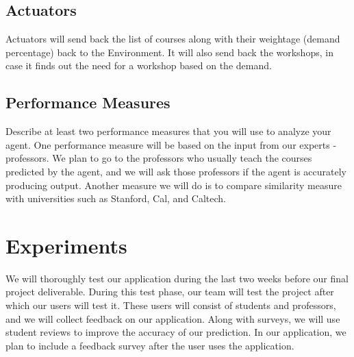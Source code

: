 \documentclass{article}
\begin{document}
\subsection{Actuators}
Actuators will send back the list of courses along with their weightage (demand percentage) back to the Environment. It will also send back the workshops, in case it finds out the need for a workshop based on the demand.

\subsection{Performance Measures}
Describe at least two performance measures that you will use to analyze your agent.
One performance measure will be based on the input from our experts - professors. We plan to go to the professors who usually teach the courses predicted by the agent, and we will ask those professors if the agent is accurately producing output. 
Another measure we will do is to compare similarity measure with universities such as Stanford, Cal, and Caltech.

\section{Experiments}
We will thoroughly test our application during the last two weeks before our final project deliverable. During this test phase, our team will test the project after which our users will test it. These users will consist of students and professors, and we will collect feedback on our application. Along with surveys, we will use student reviews to improve the accuracy of our prediction. In our application, we plan to include a feedback survey after the user uses the application. 

 

\end{document}
